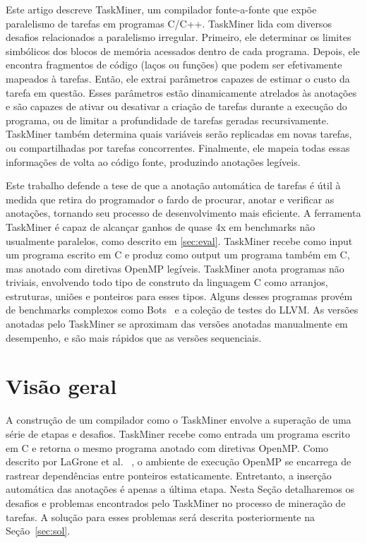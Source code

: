 \documentclass[sigplan,10pt,review]{acmart}
\newcommand\Taskminer{\mbox{\textsf{TaskMiner}}}
\begin{document}
Este artigo descreve {\Taskminer}, um compilador fonte-a-fonte que expõe
paralelismo de tarefas em programas C/C++. {\Taskminer} lida com diversos desafios 
relacionados a paralelismo irregular. Primeiro, ele determinar os limites
simbólicos dos blocos de memória acessados dentro de cada programa. Depois,
ele encontra fragmentos de código (laços ou funções) que podem 
ser efetivamente mapeados à tarefas. Então, ele extrai parâmetros capazes
de estimar o custo da tarefa em questão. Esses parâmetros estão dinamicamente atrelados
às anotações e são capazes de ativar ou desativar a criação de tarefas durante a execução do programa,
ou de limitar a profundidade de tarefas geradas recursivamente. \Taskminer{} também determina
quais variáveis serão replicadas em novas tarefas, ou compartilhadas por tarefas concorrentes.
Finalmente, ele mapeia todas essas informações de volta ao código fonte, produzindo
anotações legíveis.

Este trabalho defende a tese de que a anotação automática de tarefas é útil à medida que
retira do programador o fardo de procurar, anotar e verificar as anotações, tornando seu
processo de desenvolvimento mais eficiente. A ferramenta {\Taskminer} é capaz
de alcançar ganhos de quase 4x em benchmarks não usualmente paralelos, como descrito em \ref{sec:eval}. {\Taskminer}
recebe como input um programa escrito em C e produz como output um programa também em C,
mas anotado com diretivas OpenMP legíveis. {\Taskminer} anota programas não triviais, envolvendo
todo tipo de construto da linguagem C como arranjos, estruturas, uniões e ponteiros para esses tipos.
Alguns desses programas provém de benchmarks complexos como Bots~\cite{Duran09}  e a coleção de testes do LLVM.
As versões anotadas pelo {\Taskminer} se aproximam das versões anotadas manualmente em
desempenho, e são mais rápidos que as versões sequenciais.


\section{Visão geral}
\label{sec:ovf}

A construção de um compilador como o \Taskminer{} envolve a superação de uma série de etapas e desafios.
\Taskminer{} recebe como entrada um programa escrito em C e retorna o mesmo programa anotado com 
diretivas OpenMP. Como descrito por LaGrone et al. ~\cite{LaGrone11}, 
o ambiente de execução OpenMP se encarrega de 
rastrear dependências entre ponteiros estaticamente. Entretanto, a inserção
automática das anotações é apenas a última etapa. Nesta Seção detalharemos os desafios e problemas
encontrados pelo \Taskminer{} no processo de mineração de tarefas. A solução para esses problemas será descrita 
posteriormente na Seção~\ref{sec:sol}.
\end{document}
